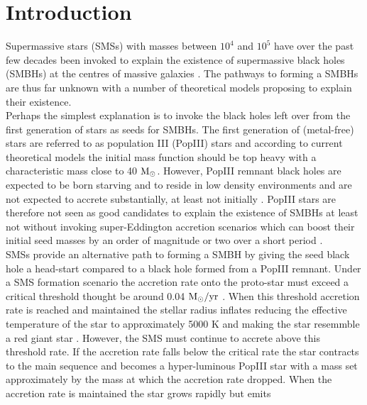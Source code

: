 \documentclass[graphics, twocolumn, usenatbib]{mn2e}
\newcommand{\msolarc} {$\rm{M_{\odot}}$}
\newcommand{\msolaryr} {$\rm{M_{\odot}/yr}~$}
\begin{document}
\section{Introduction} \label{Sec:Introduction}
Supermassive stars (SMSs) with masses between $10^4$ and $10^5$ have over the past few decades been invoked \citep{Rees_1978, Begelman_1978, Begelman_2006,
Begelman_2008, Latif_2016a, Woods_2018} to explain the existence of supermassive black holes (SMBHs) at the centres of massive galaxies \citep{Fan_06, Kormendy_2013}. The pathways to forming a SMBHs are thus far unknown with a number of theoretical models proposing to explain their existence. \\
\indent Perhaps the
simplest explanation is to invoke the black holes left over from the first 
generation of stars as seeds for SMBHs. The first generation of (metal-free) 
stars are referred to as population III (PopIII) stars and according to 
current theoretical models \citep[e.g.][]{Turk_2009, Clark_2008, Hirano_2014, Stacy_2016} the initial mass function should be top heavy with a characteristic mass close to 40 \msolarc. However, PopIII remnant black holes are expected to be born starving \citep{Whalen_2004, Milosavljevic_2009} and to reside in low
density environments and are not expected to accrete substantially, at least not 
initially \citep{Alvarez_2009, Smith_2018}. PopIII stars are therefore not seen as good candidates to explain the existence of SMBHs at least not without invoking super-Eddington accretion scenarios which can boost their initial 
seed masses by an order of magnitude or two over a short period \citep{Lupi_2014, Pacucci_2015a, Sakurai_2016a,Inayoshi_2016, Pacucci_2017, Inayoshi_2018}.\\
\indent SMSs provide an alternative path to forming a SMBH by giving the seed black hole a head-start compared to a black hole formed from a PopIII remnant. Under a SMS formation scenario the accretion rate onto the proto-star must exceed a critical threshold thought be around 0.04 \msolaryr \cite{Sakurai_2016}. When
this threshold accretion rate is reached and maintained the stellar radius inflates reducing the effective temperature of the star to approximately 5000 K
and making the star resemmble a red giant star \citep{Omukai_2003, Hosokawa_2012, Hosokawa_2013, Woods_2017}. However, the SMS must continue to
accrete above this threshold rate. If the accretion rate falls below the critical
rate the star contracts to the main sequence and becomes a hyper-luminous PopIII
star with a mass set approximately by the mass at which the accretion rate dropped. When the accretion rate is maintained the star grows rapidly but emits
\end{document}

